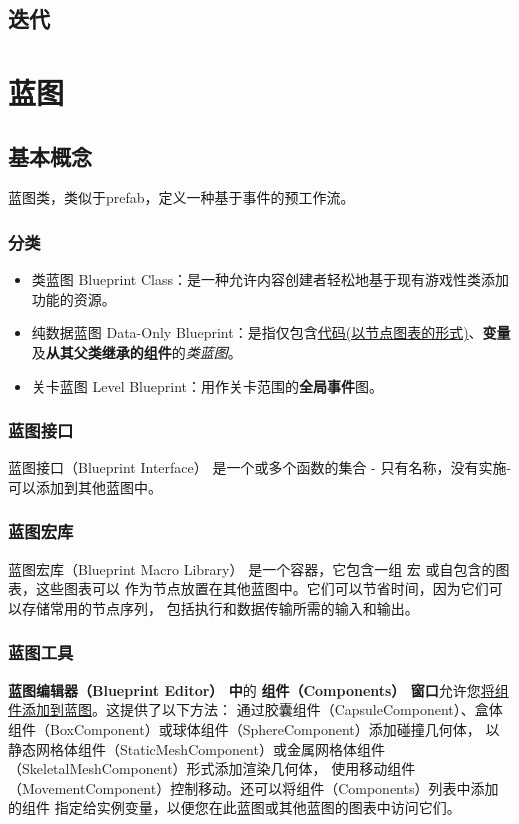 \documentclass[UTF8,a4paper,12pt]{ctexbook}
\begin{document}
	\section{迭代}



\chapter{蓝图}
	\section{基本概念}
	
		蓝图类，类似于prefab，定义一种基于事件的预工作流。
		
		\subsection{分类}
			
			\begin{itemize}
				\item 类蓝图 Blueprint Class：是一种允许内容创建者轻松地基于现有游戏性类添加功能的资源。
				\item 纯数据蓝图 Data-Only Blueprint：是指仅包含\underline{代码(以节点图表的形式)}、\textbf{变量}及\textbf{从其父类继承的组件}的\textit{类蓝图}。
				\item 关卡蓝图 Level Blueprint：用作关卡范围的\textbf{全局事件}图。
			\end{itemize}
		
		\subsection{蓝图接口}
			蓝图接口（Blueprint Interface） 是一个或多个函数的集合 - 只有名称，没有实施-可以添加到其他蓝图中。
		
		\subsection{蓝图宏库}
			蓝图宏库（Blueprint Macro Library） 是一个容器，它包含一组 宏 或自包含的图表，这些图表可以 作为节点放置在其他蓝图中。它们可以节省时间，因为它们可以存储常用的节点序列， 包括执行和数据传输所需的输入和输出。
		
		\subsection{蓝图工具}
			\textbf{蓝图编辑器（Blueprint Editor） 中}的 \textbf{组件（Components） 窗口}允许您\underline{将组件添加到蓝图}。这提供了以下方法： 通过胶囊组件（CapsuleComponent）、盒体组件（BoxComponent）或球体组件（SphereComponent）添加碰撞几何体， 以静态网格体组件（StaticMeshComponent）或金属网格体组件（SkeletalMeshComponent）形式添加渲染几何体， 使用移动组件（MovementComponent）控制移动。还可以将组件（Components）列表中添加的组件 指定给实例变量，以便您在此蓝图或其他蓝图的图表中访问它们。
		
\end{document}
